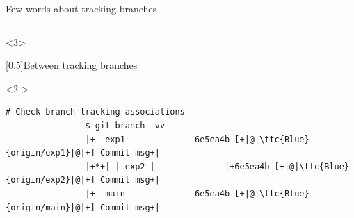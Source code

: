 \documentclass[usenames,svgnames,14pt]{beamer}
\newcommand{\ttc}[2]{\texttt{\textcolor{#1}{#2}}}%
\begin{document}
\begin{frame}[fragile]{Few words about tracking branches}
\begin{overlayarea}{\textwidth}{0.85\textheight}
\begin{overlayarea}{\textwidth}{0.35\textheight}
\begin{onlyenv}
\begin{lstlisting}[style=MyBash, xrightmargin=-1mm, xleftmargin=-1mm]
                \end{lstlisting}
            \end{onlyenv}
            \begin{onlyenv}<3>
                \vspace{-1mm}
                \begin{varblock}{}[0.5\textwidth]{Between tracking branches}
                \end{varblock}
            \end{onlyenv}
        \end{overlayarea}
        \begin{onlyenv}<2->
            \vspace{-5pt}
            \begin{lstlisting}[style=MyBash, xrightmargin=-1mm, xleftmargin=-1mm]
                # Check branch tracking associations
                $ git branch -vv
                |+  exp1              6e5ea4b [+|@|\ttc{Blue}{origin/exp1}|@|+] Commit msg+|
                |+*+| |-exp2-|              |+6e5ea4b [+|@|\ttc{Blue}{origin/exp2}|@|+] Commit msg+|
                |+  main              6e5ea4b [+|@|\ttc{Blue}{origin/main}|@|+] Commit msg+|
            \end{lstlisting}
        \end{onlyenv}
    \end{overlayarea}
\end{frame}


\end{document}
